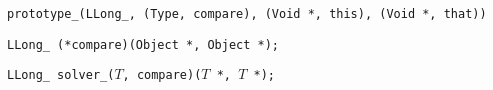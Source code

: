 \enlargethispage*{\baselineskip}
\enlargethispage*{\baselineskip}


\tt{prototype_(LLong_, (Type, compare), (Void *, this), (Void *, that))}


\tt{LLong_ (*compare)(Object *, Object *);}


\tt{LLong_ solver_(}$T$\tt{, compare)(}$T$ \tt{*,} $T$ \tt{*);}

\pagebreak
